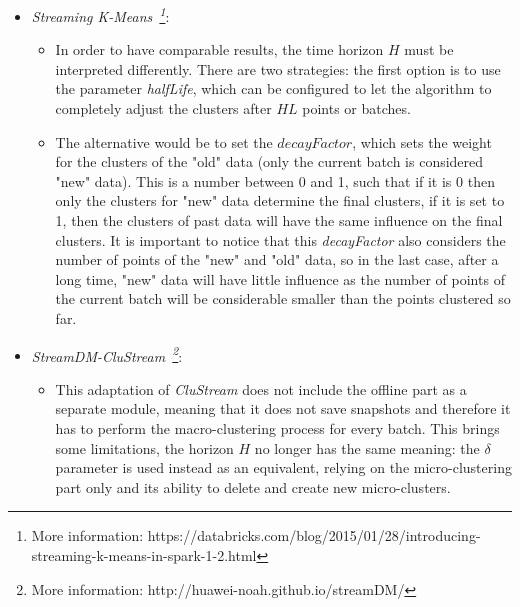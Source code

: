 

\begin{itemize}
 \item \textit{Streaming K-Means~\footnote{More information: https://databricks.com/blog/2015/01/28/introducing-streaming-k-means-in-spark-1-2.html}}:
 \begin{itemize}
  \item In order to have comparable results, the time horizon $H$ must be interpreted differently. There are two strategies: the first option is to use the parameter \textit{halfLife}, which can be configured to let the algorithm to completely adjust the clusters after $HL$ points or batches.
  \item The alternative would be to set the $decayFactor$, which sets the weight for the clusters of the "old" data (only the current batch is considered "new" data). This is a number between 0 and 1, such that if it is 0 then only the clusters for "new" data determine the final clusters, if it is set to 1, then the clusters of past data will have the same influence on the final clusters. It is important to notice that this \textit{decayFactor} also considers the number of points of the "new" and "old" data, so in the last case, after a long time, "new" data will have little influence as the number of points of the current batch will be considerable smaller than the points clustered so far.
 \end{itemize}
 \item \textit{StreamDM-CluStream~\footnote{More information: http://huawei-noah.github.io/streamDM/}}:
 \begin{itemize}
  \item This adaptation of \textit{CluStream} does not include the offline part as a separate module, meaning that it does not save snapshots and therefore it has to perform the macro-clustering process for every batch. This brings some limitations, the horizon $H$ no longer has the same meaning: the $\delta$ parameter is used instead as an equivalent, relying on the micro-clustering part only and its ability to delete and create new micro-clusters.
\end{itemize}
\end{itemize}

